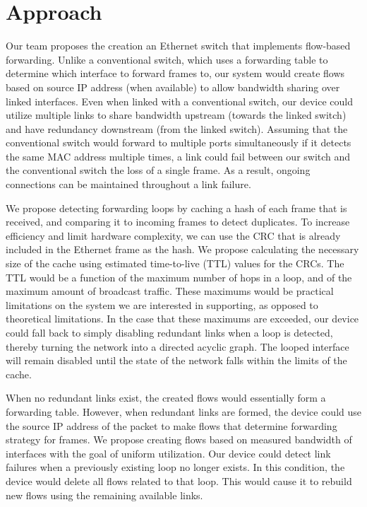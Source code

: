 \documentclass{article}
\begin{document}
\section{Approach}
	Our team proposes the creation an Ethernet switch that implements flow-based forwarding.
	Unlike a conventional switch, which uses a forwarding table to determine which interface to forward frames to, our system would create flows based on source IP address (when available) to allow bandwidth sharing over linked interfaces.
	Even when linked with a conventional switch, our device could utilize multiple links to share bandwidth upstream (towards the linked switch) and have redundancy downstream (from the linked switch).
	Assuming that the conventional switch would forward to multiple ports simultaneously if it detects the same MAC address multiple times, a link could fail between our switch and the conventional switch the loss of a single frame.
	As a result, ongoing connections can be maintained throughout a link failure.

	We propose detecting forwarding loops by caching a hash of each frame that is received, and comparing it to incoming frames to detect duplicates.
	To increase efficiency and limit hardware complexity, we can use the CRC that is already included in the Ethernet frame as the hash.
	We propose calculating the necessary size of the cache using estimated time-to-live (TTL) values for the CRCs.
	The TTL would be a function of the maximum number of hops in a loop, and of the maximum amount of broadcast traffic.
	These maximums would be practical limitations on the system we are interested in supporting, as opposed to theoretical limitations.
	In the case that these maximums are exceeded, our device could fall back to simply disabling redundant links when a loop is detected, thereby turning the network into a directed acyclic graph.
	The looped interface will remain disabled until the state of the network falls within the limits of the cache.
	
	When no redundant links exist, the created flows would essentially form a forwarding table.
	However, when redundant links are formed, the device could use the source IP address of the packet to make flows that determine forwarding strategy for frames.
	We propose creating flows based on measured bandwidth of interfaces with the goal of uniform utilization.
	Our device could detect link failures when a previously existing loop no longer exists.
	In this condition, the device would delete all flows related to that loop.
	This would cause it to rebuild new flows using the remaining available links.
\end{document}
